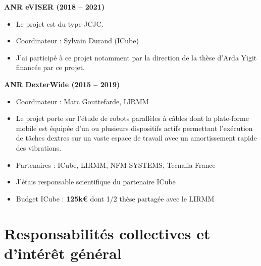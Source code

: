 \documentclass[a4paper,12pt]{article}
\newcommand{\Separation}{\noindent{\color{black!40}\rule{\textwidth}{2pt}}}
\begin{document}
\textbf{ANR eVISER (2018 -- 2021)}
\begin{itemize}
    \item Le projet est du type JCJC.
    \item Coordinateur : Sylvain Durand (ICube)
    \item J'ai participé à ce projet notamment par la direction de la thèse d’Arda Yigit financée par ce projet.
\end{itemize}

\textbf{ANR DexterWide (2015 -- 2019)}
\begin{itemize}
    \item Coordinateur : Marc Gouttefarde, LIRMM
    \item Le projet porte sur l'étude de robots parallèles à câbles dont la plate-forme mobile est équipée d’un ou plusieurs dispositifs actifs permettant l’exécution de tâches dextres sur un vaste espace de travail avec un amortissement rapide des vibrations.
    \item Partenaires : ICube, LIRMM, NFM SYSTEMS, Tecnalia France
    \item J'étais responsable scientifique du partenaire ICube
    \item Budget ICube : \textbf{125k€} dont 1/2 thèse partagée avec le LIRMM
\end{itemize}



\printbibliography[title={\small Bibliographie de la section << Activités scientifiques >>}]

\Separation{}


\section{Responsabilités collectives et d'intérêt général}
\end{document}
